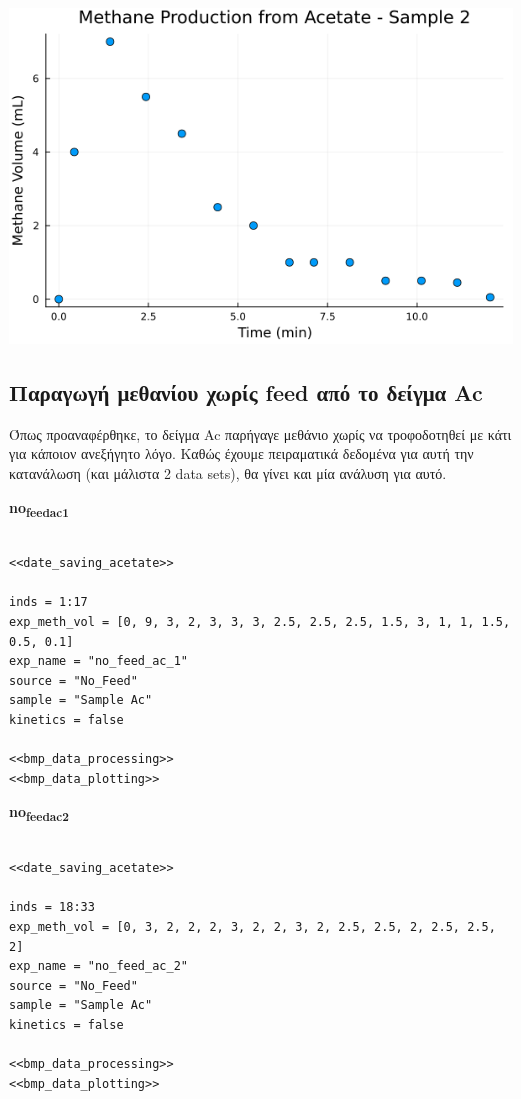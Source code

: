 \documentclass[11pt]{article}
\begin{document}
\begin{center}
\includegraphics[width=.9\linewidth]{../plots/BMPs/Acetate/acet_test_2_min.png}
\end{center}

\subsection{Παραγωγή μεθανίου χωρίς feed από το δείγμα Ac}
\label{sec:org60ea202}
Όπως προαναφέρθηκε, το δείγμα Ac παρήγαγε μεθάνιο χωρίς να τροφοδοτηθεί με κάτι για κάποιον ανεξήγητο λόγο. Καθώς έχουμε πειραματικά δεδομένα για αυτή την κατανάλωση (και μάλιστα 2 data sets), θα γίνει και μία ανάλυση για αυτό.

\textbf{no\textsubscript{feed}\textsubscript{ac}\textsubscript{1}}
\begin{verbatim}

<<date_saving_acetate>>

inds = 1:17
exp_meth_vol = [0, 9, 3, 2, 3, 3, 3, 2.5, 2.5, 2.5, 1.5, 3, 1, 1, 1.5, 0.5, 0.1]
exp_name = "no_feed_ac_1"
source = "No_Feed"
sample = "Sample Ac"
kinetics = false

<<bmp_data_processing>>
<<bmp_data_plotting>>
\end{verbatim}

\textbf{no\textsubscript{feed}\textsubscript{ac}\textsubscript{2}}
\begin{verbatim}

<<date_saving_acetate>>

inds = 18:33
exp_meth_vol = [0, 3, 2, 2, 2, 3, 2, 2, 3, 2, 2.5, 2.5, 2, 2.5, 2.5, 2]
exp_name = "no_feed_ac_2"
source = "No_Feed"
sample = "Sample Ac"
kinetics = false

<<bmp_data_processing>>
<<bmp_data_plotting>>
\end{verbatim}
\end{document}
